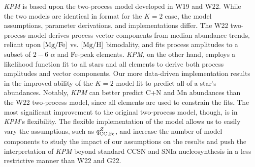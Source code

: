 \documentclass[modern]{aastex631}
\newcommand{\mgfe}[0]{[{\rm Mg/Fe}]}
\newcommand{\mgh}{[{\rm Mg}/{\rm H}]}
\newcommand{\qccFe}{q_{{\rm CC, Fe}}^{Z}}
\newcommand{\name}{\textsl{KPM}}
\begin{document}
\name{} is based upon the two-process model developed in W19 and W22. While the two models are identical in format for the $K=2$ case, the model assumptions, parameter derivations, and implementations differ. The W22 two-process model derives process vector components from median abundance trends, reliant upon $\mgfe$ vs. $\mgh$ bimodality, and fits process amplitudes to a subset of $2-6$ $\alpha$ and Fe-peak elements. \name{}, on the other hand, employs a likelihood function fit to all stars and all elements to derive both process amplitudes and vector components. Our more data-driven implementation results in the improved ability of the $K=2$ model fit to predict all of a star's abundances. Notably, \name{} can better predict C+N and Mn abundances than the W22 two-process model, since all elements are used to constrain the fits. The most significant improvement to the original two-process model, though, is in \name{}'s flexibility. The flexible implementation of the model allows us to easily vary the assumptions, such as $\qccFe$, and increase the number of model components to study the impact of our assumptions on the results and push the interpretation of \name{} beyond standard CCSN and SNIa nucleosynthesis in a less restrictive manner than W22 and G22. 
\end{document}
